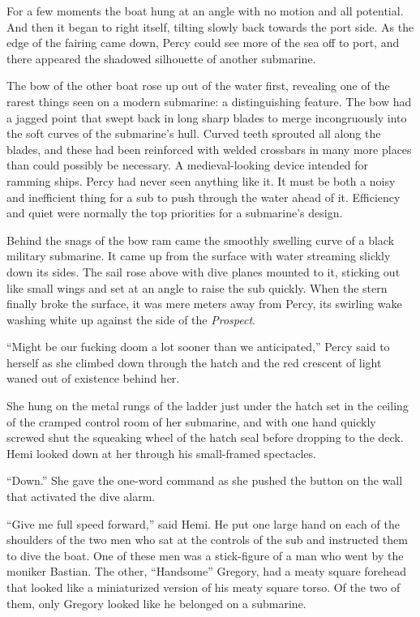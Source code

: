 \documentclass[
]{scrbook}
\begin{document}
For a few moments the boat hung at an angle with no motion and all
potential. And then it began to right itself, tilting slowly back
towards the port side. As the edge of the fairing came down, Percy could
see more of the sea off to port, and there appeared the shadowed
silhouette of another submarine.

The bow of the other boat rose up out of the water first, revealing one
of the rarest things seen on a modern submarine: a distinguishing
feature. The bow had a jagged point that swept back in long sharp blades
to merge incongruously into the soft curves of the submarine's hull.
Curved teeth sprouted all along the blades, and these had been
reinforced with welded crossbars in many more places than could possibly
be necessary. A medieval-looking device intended for ramming ships.
Percy had never seen anything like it. It must be both a noisy and
inefficient thing for a sub to push through the water ahead of it.
Efficiency and quiet were normally the top priorities for a submarine's
design.

Behind the snags of the bow ram came the smoothly swelling curve of a
black military submarine. It came up from the surface with water
streaming slickly down its sides. The sail rose above with dive planes
mounted to it, sticking out like small wings and set at an angle to
raise the sub quickly. When the stern finally broke the surface, it was
mere meters away from Percy, its swirling wake washing white up against
the side of the \emph{Prospect}.

``Might be our fucking doom a lot sooner than we anticipated,'' Percy
said to herself as she climbed down through the hatch and the red
crescent of light waned out of existence behind her.

\bigskip

She hung on the metal rungs of the ladder just under the hatch set in
the ceiling of the cramped control room of her submarine, and with one
hand quickly screwed shut the squeaking wheel of the hatch seal before
dropping to the deck. Hemi looked down at her through his small-framed
spectacles.

``Down.'' She gave the one-word command as she pushed the button on the
wall that activated the dive alarm.

``Give me full speed forward,'' said Hemi. He put one large hand on each
of the shoulders of the two men who sat at the controls of the sub and
instructed them to dive the boat. One of these men was a stick-figure of
a man who went by the moniker Bastian. The other, ``Handsome'' Gregory,
had a meaty square forehead that looked like a miniaturized version of
his meaty square torso. Of the two of them, only Gregory looked like he
belonged on a submarine.
\end{document}
